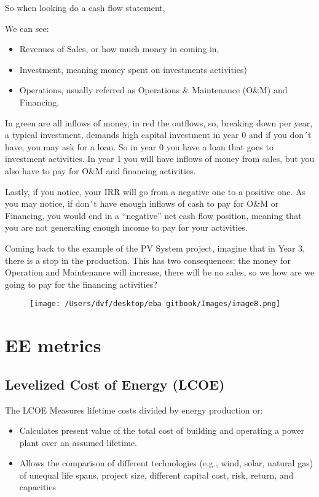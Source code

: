 \documentclass[]{book}
\providecommand{\tightlist}{%
  \setlength{\itemsep}{0pt}\setlength{\parskip}{0pt}}
\theoremstyle{definition}
\theoremstyle{definition}
\theoremstyle{definition}
\theoremstyle{remark}
\begin{document}
So when looking do a cash flow statement,

We can see:

\begin{itemize}
\item
  Revenues of Sales, or how much money in coming in,
\item
  Investment, meaning money spent on investments activities)
\item
  Operations, usually referred as Operations \& Maintenance (O\&M) and
  Financing.
\end{itemize}

In green are all inflows of money, in red the outflows, so, breaking
down per year, a typical investment, demands high capital investment in
year 0 and if you don´t have, you may ask for a loan. So in year 0 you
have a loan that goes to investment activities. In year 1 you will have
inflows of money from sales, but you also have to pay for O\&M and
financing activities.

Lastly, if you notice, your IRR will go from a negative one to a
positive one. As you may notice, if don´t have enough inflows of cash to
pay for O\&M or Financing, you would end in a ``negative'' net cash flow
position, meaning that you are not generating enough income to pay for
your activities.

Coming back to the example of the PV System project, imagine that in
Year 3, there is a stop in the production. This has two consequences:
the money for Operation and Maintenance will increase, there will be no
sales, so we how are we going to pay for the financing activities?

\begin{figure}[htbp]
\centering
\texttt{[image: /Users/dvf/desktop/eba gitbook/Images/image8.png]}
\caption{}
\end{figure}

\section{EE metrics}\label{ee-metrics}

\subsection{Levelized Cost of Energy
(LCOE)}\label{levelized-cost-of-energy-lcoe}

The LCOE Measures lifetime costs divided by energy production or:

\begin{itemize}
\tightlist
\item
  Calculates present value of the total cost of building and operating a
  power plant over an assumed lifetime.
\item
  Allows the comparison of different technologies (e.g., wind, solar,
  natural gas) of unequal life spans, project size, different capital
  cost, risk, return, and capacities
\end{itemize}
\end{document}
